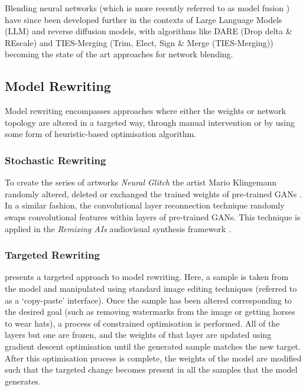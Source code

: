 Blending neural networks (which is more recently referred to as model fusion \citep{li2023deep}) have since been developed further in the contexts of Large Language Models (LLM) and reverse diffusion models, with algorithms like DARE (Drop delta \& REscale) \citep{yu2024language} and TIES-Merging (Trim, Elect, Sign \& Merge (TIES-Merging)) becoming the state of the art approaches for network blending.

\subsection{Model Rewriting}
\label{survey:rewriting}

Model rewriting encompasses approaches where either the weights or network topology are altered in a targeted way, through manual intervention or by using some form of heuristic-based optimisation algorithm. 

\subsubsection{Stochastic Rewriting} 

To create the series of artworks \textit{Neural Glitch} the artist Mario Klingemann randomly altered, deleted or exchanged the trained weights of pre-trained GANs \citep{klingemann2018neural}. 
In a similar fashion, the convolutional layer reconnection technique \citep{ruzika2020gan} randomly swaps convolutional features within layers of pre-trained GANs. 
This technique is applied in the \textit{Remixing AIs} audiovisual synthesis framework \citep{collins2020remixing}.

\subsubsection{Targeted Rewriting} 
\citet{bau2020rewriting} presents a targeted approach to model rewriting. 
Here, a sample is taken from the model and manipulated using standard image editing techniques (referred to as a `copy-paste' interface). 
Once the sample has been altered corresponding to the desired goal (such as removing watermarks from the image or getting horses to wear hats), a process of constrained optimisation is performed. 
All of the layers but one are frozen, and the weights of that layer are updated using gradient descent optimisation until the generated sample matches the new target. 
After this optimisation process is complete, the weights of the model are modified such that the targeted change becomes present in all the samples that the model generates.

